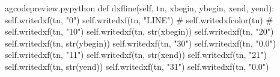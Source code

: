 \documentclass{ltxdoc}
\begin{document}
%

\lstset{firstnumber=\thegcpy}
\begin{writecode}{a}{gcodepreview.py}{python}
    def dxfline(self, tn, xbegin, ybegin, xend, yend):
        self.writedxf(tn, "0")
        self.writedxf(tn, "LINE")
#
        self.writedxfcolor(tn)
#
        self.writedxf(tn, "10")
        self.writedxf(tn, str(xbegin))
        self.writedxf(tn, "20")
        self.writedxf(tn, str(ybegin))
        self.writedxf(tn, "30")
        self.writedxf(tn, "0.0")
        self.writedxf(tn, "11")
        self.writedxf(tn, str(xend))
        self.writedxf(tn, "21")
        self.writedxf(tn, str(yend))
        self.writedxf(tn, "31")
        self.writedxf(tn, "0.0")

\end{writecode}
\addtocounter{gcpy}{18}
\end{document}
